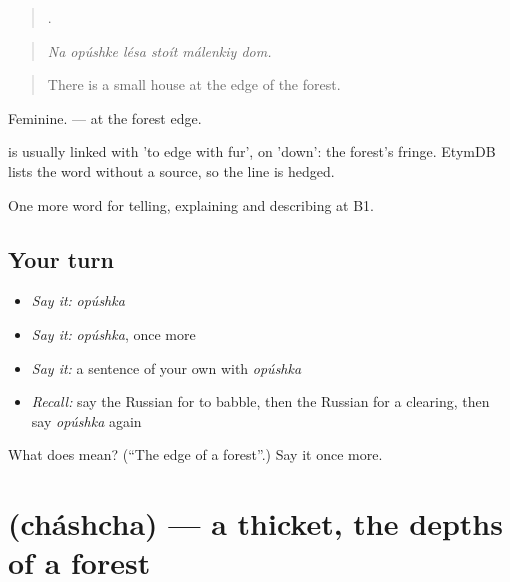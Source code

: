\begin{quote}
     .
\end{quote}

\begin{quote}
\emph{Na opúshke lésa stoít málenkiy dom.}
\end{quote}

\begin{quote}
There is a small house at the edge of the forest.
\end{quote}

Feminine. \emph{ } — at the forest edge.

\begin{cousinweb}
\emph{} is usually linked with \emph{} 'to edge with fur', on \emph{} 'down': the forest's fringe. EtymDB lists the word without a source, so the line is hedged.
\end{cousinweb}

\begin{grammarlens}[title={What you've built}]
One more word for telling, explaining and describing at B1.
\end{grammarlens}

\subsection*{Your turn}
\begin{itemize}
\raggedright
  \item \emph{Say it:} \emph{opúshka}
  \item \emph{Say it:} \emph{opúshka}, once more
  \item \emph{Say it:} a sentence of your own with \emph{opúshka}
  \item \emph{Recall:} say the Russian for to babble, then the Russian for a clearing, then say \emph{opúshka} again
\end{itemize}

\begin{tcolorbox}[breakable,colback=teal!4,colframe=teal!35!black,title={Before you move on}]
What does  mean? (\textquotedblleft{}The edge of a forest\textquotedblright{}.) Say it once more.
\end{tcolorbox}
\section[\texorpdfstring{\ru{чаща} (cháshcha)}{чаща (cháshcha)}]{ (cháshcha) — a thicket, the depths of a forest}

